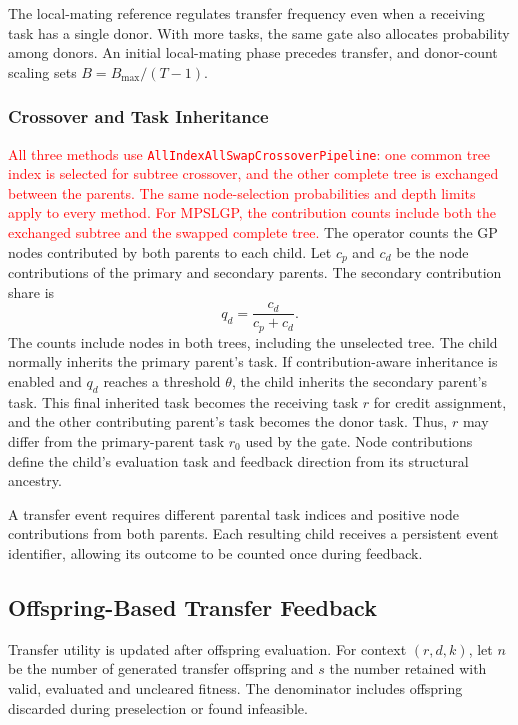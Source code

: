 \documentclass[10pt,journal]{IEEEtran}
\newcommand{\key}[1]{\textcolor{red}{#1}}
\begin{document}
The local-mating reference regulates transfer frequency even when a receiving task has a single donor. With more tasks, the same gate also allocates probability among donors. An initial local-mating phase precedes transfer, and donor-count scaling sets $B=B_{\max}/(T-1)$.

\subsubsection{Crossover and Task Inheritance}
\key{All three methods use \texttt{AllIndexAllSwapCrossoverPipeline}: one common tree index is selected for subtree crossover, and the other complete tree is exchanged between the parents. The same node-selection probabilities and depth limits apply to every method. For MPSLGP, the contribution counts include both the exchanged subtree and the swapped complete tree.} The operator counts the GP nodes contributed by both parents to each child. Let $c_p$ and $c_d$ be the node contributions of the primary and secondary parents. The secondary contribution share is
\begin{equation}
    q_d=\frac{c_d}{c_p+c_d}.
\end{equation}
The counts include nodes in both trees, including the unselected tree. The child normally inherits the primary parent's task. If contribution-aware inheritance is enabled and $q_d$ reaches a threshold $\theta$, the child inherits the secondary parent's task. This final inherited task becomes the receiving task $r$ for credit assignment, and the other contributing parent's task becomes the donor task. Thus, $r$ may differ from the primary-parent task $r_0$ used by the gate. Node contributions define the child's evaluation task and feedback direction from its structural ancestry.

A transfer event requires different parental task indices and positive node contributions from both parents. Each resulting child receives a persistent event identifier, allowing its outcome to be counted once during feedback.

\subsection{Offspring-Based Transfer Feedback}
Transfer utility is updated after offspring evaluation. For context $(r,d,k)$, let $n$ be the number of generated transfer offspring and $s$ the number retained with valid, evaluated and uncleared fitness. The denominator includes offspring discarded during preselection or found infeasible.
\end{document}
